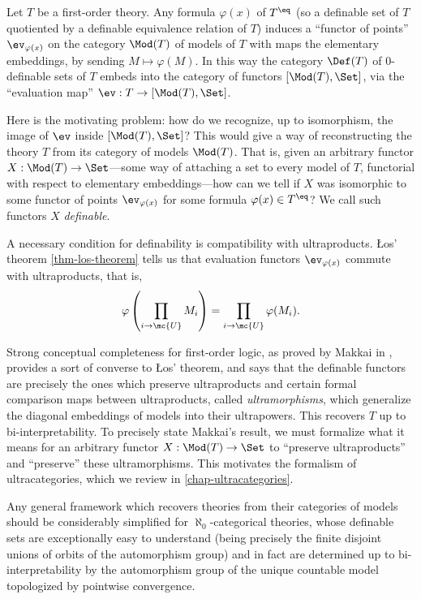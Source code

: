 Let $T$ be a first-order theory. Any formula $\varphi(x)$ of $T^{\eq}$ (so a definable set of $T$ quotiented by a definable equivalence relation of $T$) induces a ``functor of points'' $\ev_{\varphi(x)}$ on the category $\Mod(T)$ of models of $T$ with maps the elementary embeddings, by sending $M \mapsto \varphi(M)$. In this way the category $\Def(T)$ of $0$-definable sets of $T$ embeds into the category of functors $[\Mod(T), \Set]$, via the ``evaluation map'' $\ev : T \to [\Mod(T), \Set]$.

Here is the motivating problem: how do we recognize, up to isomorphism, the image of $\ev$ inside $[\Mod(T), \Set]$? This would give a way of reconstructing the theory $T$ from its category of models $\Mod(T)$. That is, given an arbitrary functor $X : \Mod(T) \to \Set$---some way of attaching a set to every model of $T$, functorial with respect to elementary embeddings---how can we tell if $X$ was isomorphic to some functor of points $\ev_{\varphi(x)}$ for some formula $\varphi(x) \in T^{\eq}$? We call such functors $X$ \emph{definable}.

A necessary condition for definability is compatibility with ultraproducts. {\L}os' theorem \ref{thm-los-theorem} tells us that evaluation functors $\ev_{\varphi(x)}$ commute with ultraproducts, that is,
$$
\varphi\left(\prod_{i \to \mc{U}} M_i \right) = \prod_{i \to \mc{U}} \varphi(M_i).
$$

Strong conceptual completeness for first-order logic, as proved by Makkai in \cite{makkai-sdfol}, provides a sort of converse to {\L}os' theorem, and says that the definable functors are precisely the ones which preserve ultraproducts and certain formal comparison maps between ultraproducts, called \emph{ultramorphisms}, which generalize the diagonal embeddings of models into their ultrapowers. This recovers $T$ up to bi-interpretability. To precisely state Makkai's result, we must formalize what it means for an arbitrary functor $X : \Mod(T) \to \Set$ to ``preserve ultraproducts'' and ``preserve'' these ultramorphisms. This motivates the formalism of ultracategories, which we review in \autoref{chap-ultracategories}.

Any general framework which recovers theories from their categories of models should be considerably simplified for $\aleph_0$-categorical theories, whose definable sets are exceptionally easy to understand (being precisely the finite disjoint unions of orbits of the automorphism group) and in fact are determined up to bi-interpretability by the automorphism group of the unique countable model topologized by pointwise convergence.

